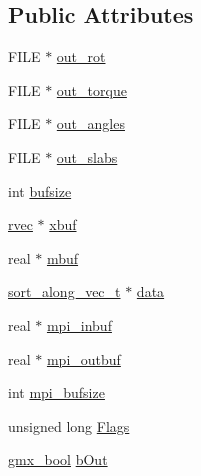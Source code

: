 \subsection*{\-Public \-Attributes}
\begin{DoxyCompactItemize}
\item 
\-F\-I\-L\-E $\ast$ \hyperlink{structgmx__enfrot_a2714985fe3702a12979dbc6a4143d895}{out\-\_\-rot}
\item 
\-F\-I\-L\-E $\ast$ \hyperlink{structgmx__enfrot_a1b9f6d19f38a3ef925d4f7cc344a46d0}{out\-\_\-torque}
\item 
\-F\-I\-L\-E $\ast$ \hyperlink{structgmx__enfrot_a592a9fb71898d053bc1126cede0ecd17}{out\-\_\-angles}
\item 
\-F\-I\-L\-E $\ast$ \hyperlink{structgmx__enfrot_a6d0ff8951b1f6e3e13cc92a2afe264cd}{out\-\_\-slabs}
\item 
int \hyperlink{structgmx__enfrot_a7b99109d5925ba567701673220ad1aef}{bufsize}
\item 
\hyperlink{share_2template_2gromacs_2types_2simple_8h_aa02a552a4abd2f180c282a083dc3a999}{rvec} $\ast$ \hyperlink{structgmx__enfrot_a99d0a60f25544436e59d07457e05811f}{xbuf}
\item 
real $\ast$ \hyperlink{structgmx__enfrot_a2990ae02444ac6f81b92d434ca4dfb62}{mbuf}
\item 
\hyperlink{structsort__along__vec__t}{sort\-\_\-along\-\_\-vec\-\_\-t} $\ast$ \hyperlink{structgmx__enfrot_a4d844be7781692509b1055a4955bd295}{data}
\item 
real $\ast$ \hyperlink{structgmx__enfrot_a51ac87bda1dd92174d5550313085bf96}{mpi\-\_\-inbuf}
\item 
real $\ast$ \hyperlink{structgmx__enfrot_a1719c7ac65fbc7ecaf99bdab41d850c3}{mpi\-\_\-outbuf}
\item 
int \hyperlink{structgmx__enfrot_a3edd02654c398063b81fe473666de511}{mpi\-\_\-bufsize}
\item 
unsigned long \hyperlink{structgmx__enfrot_a35fb9deb5a48a126d4a4ee1b49a56233}{\-Flags}
\item 
\hyperlink{include_2types_2simple_8h_a8fddad319f226e856400d190198d5151}{gmx\-\_\-bool} \hyperlink{structgmx__enfrot_a4e3ff7c84133b7194fd78b91d158a545}{b\-Out}
\end{DoxyCompactItemize}


